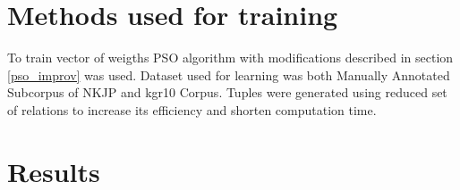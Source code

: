 \section{Methods used for training}
To train vector of weigths PSO algorithm with modifications described in section \ref{pso_improv} was used. 
Dataset used for learning was both Manually Annotated Subcorpus of NKJP and kgr10 Corpus. Tuples were generated using reduced set of relations
to increase its efficiency and shorten computation time.



\section{Results}






